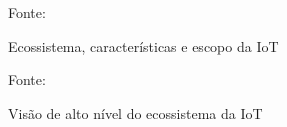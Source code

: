 \documentclass[pdftex, brazil, 12pt, twoside]{article}
\begin{document}
\begin{figure}[h]
  \begin{center}
    \caption{Ecossistema, características e escopo da IoT}
    \label{fig:ecossistema1}
    
    \footnotesize{Fonte:~\citet[][p.\ 74]{IEEEIoTDefinition}}
  \end{center}
\end{figure}

\begin{figure}[h]
  \begin{center}
    \caption{Visão de alto nível do ecossistema da IoT}
    \label{fig:ecossistema2}
    
    \footnotesize{Fonte:~\citet[][p.\ 13]{UKGOSWalportIoT2014}}
  \end{center}
\end{figure}
\end{document}
